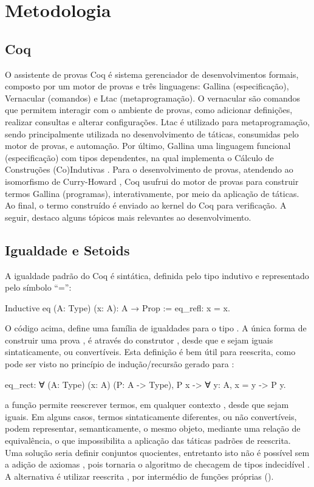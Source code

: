 \chapter{Metodologia}\label{chp:metodologia}

\section{Coq}
O assistente de provas Coq \cite{Coq2021} é sistema gerenciador de desenvolvimentos formais, composto por um motor de provas e três linguagens: Gallina (especificação), Vernacular (comandos) e Ltac (metaprogramação). O vernacular são comandos que permitem interagir com o ambiente de provas, como adicionar definições, realizar consultas e alterar configurações. Ltac é utilizado para metaprogramação, sendo principalmente utilizada no desenvolvimento de táticas, consumidas pelo motor de provas, e automação. Por último, Gallina uma linguagem funcional (especificação) com tipos dependentes, na qual implementa o Cálculo de Construções (Co)Indutivas \cite{Coquand1988,Coquand1990,PaulinMohring1993}. Para o desenvolvimento de provas, atendendo ao isomorfismo de Curry-Howard \cite{Soerensen2006}, Coq usufrui do motor de provas para construir termos Gallina (programas), interativamente, por meio da aplicação de táticas. Ao final, o termo construído é enviado ao kernel do Coq para verificação. A seguir, destaco alguns tópicos mais relevantes ao desenvolvimento.

\section{Igualdade e Setoids}
A igualdade padrão do Coq é sintática, definida pelo tipo indutivo  e representado pelo símbolo ``='':
\begin{coqcode}
Inductive eq (A: Type) (x: A): A → Prop := eq_refl: x = x.	
\end{coqcode}
O código acima, define uma família de igualdades para o tipo . A única forma de construir uma prova , é através do construtor , desde que  e  sejam iguais sintaticamente, ou convertíveis. Esta definição é bem útil para reescrita, como pode ser visto no princípio de indução/recursão gerado para :
\begin{coqcode}
eq_rect: ∀ (A: Type) (x: A) (P: A -> Type), P x -> ∀ y: A, x = y -> P y.
\end{coqcode}
a função  permite reescrever termos, em qualquer contexto , desde que sejam iguais. Em alguns casos, termos sintaticamente diferentes, ou não convertíveis, podem representar, semanticamente, o mesmo objeto, mediante uma relação de equivalência, o que impossibilita a aplicação das táticas padrões de reescrita. Uma solução seria definir conjuntos quocientes, entretanto isto não é possível sem a adição de axiomas \cite{Chicli2003}, pois tornaria o algoritmo de checagem de tipos indecidível \cite{Geuvers2002}. A alternativa é utilizar reescrita \setoid, por intermédio de funções próprias ().


